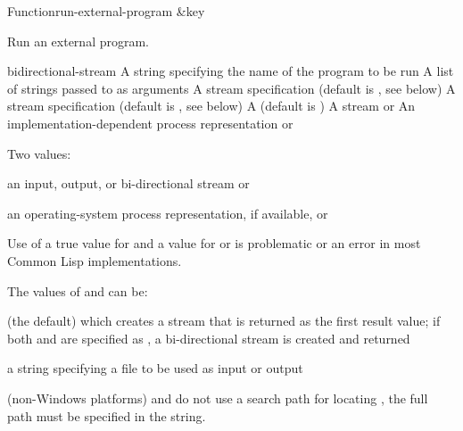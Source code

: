 \documentclass[10pt,twoside,english,pdftex]{article}
\begin{document}
\begin{functiondoc}{Function}{run-external-program}{
  \&key 
  }
%
%

\fnsyntax

\fnpurpose Run an external program.

\fnpackage {}

\fnmodule {}

\fnargs
\begin{args}{bidirectional-stream}
\arg[program] A string specifying the name of the program to be run
\arg[args] A list of strings passed to  as arguments
\arg[input] A stream specification (default is , 
see below)
\arg[output] A stream specification (default is ,
see below)
\arg[wait] A  (default is \nil)
 A stream or \nil{}
\arg[os-process] An implementation-dependent process representation or \nil{}
\end{args}

\fnreturns Two values:
\begin{tightitemize}
\item an input, output, or bi-directional stream or \nil{}
\item an operating-system process representation, if available, or \nil{}
\end{tightitemize}
  
\fnerrors Use of a true value for  and a 
value for  or  is problematic or an error in most
Common Lisp implementations.

\fndescription
The values of  and  can be:
\begin{tightitemize}
\item {} (the default) which creates a stream that is returned as
  the first result value; if both  and  are
  specified as , a bi-directional stream is created and
  returned
\item a string specifying a file to be used as input or output
\end{tightitemize}

 (non-Windows platforms) and
 do not use a search path for
locating , the full path must be specified in the 
string.


\end{functiondoc}
\end{document}

